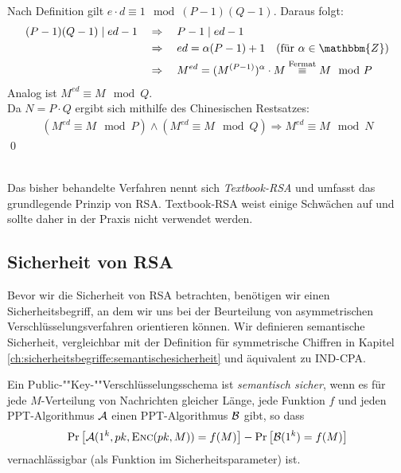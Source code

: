 \begin{beweis}
Nach Definition gilt $e \cdot d \equiv 1 \mod (P-1)(Q-1)$. Daraus folgt:
\begin{align*}
(P-1)(Q-1) \mid ed - 1 \quad
& \Rightarrow \quad P-1 \mid ed - 1\\
& \Rightarrow \quad ed = \alpha (P-1) + 1 \quad (\text{für } \alpha \in \mathbbm{Z})\\
& \Rightarrow \quad M^{ed} = (M^{(P-1)})^{\alpha} \cdot M \stackrel{\text{Fermat}}\equiv M \mod P
\end{align*}
Analog ist $M^{ed} \equiv M \mod Q$.\\
Da $N = P \cdot Q$ ergibt sich mithilfe des Chinesischen Restsatzes:
\begin{align*}
(M^{ed} \equiv M \mod P) \land (M^{ed} \equiv M \mod Q) \Rightarrow M^{ed} \equiv M \mod N
\end{align*}
\qed
\end{beweis}

~\\
Das bisher behandelte Verfahren nennt sich \textit{Textbook-RSA} und umfasst das grundlegende Prinzip von RSA. Textbook-RSA weist einige Schwächen auf und
sollte daher in der Praxis nicht verwendet werden.


\subsection{Sicherheit von RSA}
\label{ch:asymmenc:rsa:sicherheit}
Bevor wir die Sicherheit von RSA betrachten, benötigen wir einen Sicherheitsbegriff, an dem wir uns bei der Beurteilung von asymmetrischen
Verschlüsselungsverfahren orientieren können. Wir definieren semantische Sicherheit, vergleichbar mit der Definition für symmetrische Chiffren in Kapitel
\ref{ch:sicherheitsbegriffe:semantischesicherheit} und äquivalent zu IND-CPA.

\vspace{10pt}
\begin{definition}
Ein Pub\-lic-""Key-""Ver\-schlüs\-sel\-ungs\-sche\-ma ist \textit{semantisch sicher}, wenn es für jede $M$-Verteilung von Nachrichten gleicher Länge, jede
Funktion $f$ und jeden PPT-Algorithmus $\mathcal{A}$ einen PPT-Algorithmus $\mathcal{B}$ gibt, so dass
\begin{equation*}
\Pr\left[\mathcal{A}(1^k, pk, \textsc{Enc}(pk, M)) = f(M)\right] - \Pr\left[\mathcal{B}(1^k) = f(M)\right]
\end{equation*}
vernachlässigbar (als Funktion im Sicherheitsparameter) ist.
\end{definition} 

